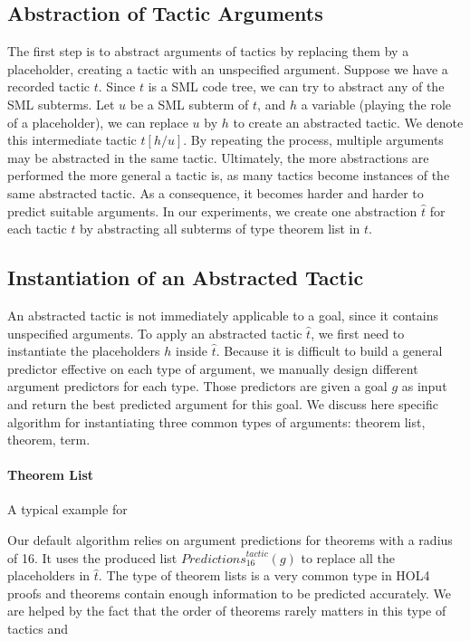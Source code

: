 \documentclass[runningheads,a4paper,draft]{svjour3}
\def\holfour{\textsf{HOL4}\xspace}
\def\sml{\textsf{SML}\xspace}
\begin{document}
\subsection{Abstraction of Tactic Arguments}
The first step is to abstract arguments of tactics by replacing them by a
placeholder, creating a tactic with an unspecified argument.
Suppose we have a recorded tactic $t$. Since $t$ is a \sml code tree, we can
try to abstract any of the
\sml subterms. Let $u$ be a \sml subterm of $t$, and $h$ a variable (playing
the role of a placeholder), we
can replace $u$ by $h$ to create an abstracted tactic.
We denote this intermediate tactic $t[h/u]$. By repeating the
process, multiple
arguments may be abstracted in the same tactic. Ultimately, the more
abstractions are performed the more general a tactic is, as many tactics
become instances of the same abstracted tactic. As a consequence, it becomes
harder and harder to predict suitable arguments. In our experiments, we create
one abstraction $\hat{t}$ for each tactic $t$ by abstracting all subterms of
type theorem list in $t$.

\subsection{Instantiation of an Abstracted Tactic}
An abstracted tactic is not immediately applicable to a goal, since it contains
unspecified arguments. To apply an abstracted tactic $\hat{t}$, we first need
to
instantiate the placeholders $h$ inside $\hat{t}$. Because it is difficult to
build a general predictor effective on each type of argument, we manually
design different argument predictors for each type. Those predictors are
given a goal $g$ as input and return the best predicted argument for this
goal. We discuss here specific algorithm for instantiating three common types 
of arguments: theorem list, theorem, term.


\paragraph{Theorem List}
A typical example for


Our default algorithm relies on argument predictions for theorems with a
radius of 16. It uses the produced list
$\mathit{Predictions}^{\mathit{tactic}}_{16}(g)$ to replace all the
placeholders
in $\hat{t}$.
The type of theorem lists is a very common type in \holfour proofs and theorems 
contain enough information to be predicted accurately.
We are helped by the fact that the order of theorems rarely matters in this 
type of tactics and
\end{document}
